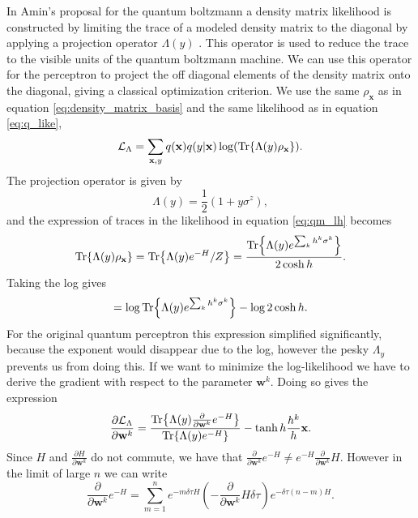 In Amin's proposal for the quantum boltzmann a density matrix likelihood is constructed by limiting the trace of a modeled density matrix to the diagonal by applying a projection operator $\Lambda(y)$  \cite{Amin2018}. This operator is used to reduce the trace to the visible units of the quantum boltzmann machine. We can use this operator for the perceptron to project the off diagonal elements of the density matrix onto the diagonal, giving a classical optimization criterion. We use the same $\rho_\mathbf{x}$ as in equation \ref{eq:density_matrix_basis} and the same likelihood as in equation \ref{eq:q_like},
\begin{equation}
    \mathcal{L}_{\Lambda} = \sum_{\mathbf{x},y} q(\mathbf{x})q(y | \mathbf{x}) \log(\Tr{\Lambda(y)\rho_\mathbf{x}})
    \label{eq:qm_lh}.
\end{equation}
The projection operator is given by
\begin{equation*}
    \Lambda(y) = \frac{1}{2} (1 + y\sigma^z),
\end{equation*}
and the expression of traces in the likelihood in equation \ref{eq:qm_lh} becomes
\begin{equation*}
    \Tr{\Lambda(y) \rho_\mathbf{x}} = \Tr{\Lambda(y) e^{-H} / Z} = \frac{\Tr{\Lambda(y) e^{\sum_k h^k \sigma^k}}}{2 \cosh h}.
\end{equation*}
Taking the log gives
\begin{equation}
  = \log\Tr{\Lambda(y) e^{\sum_k h^k \sigma^k}} - \log2 \cosh h
  \label{eq:lh_tr}.
\end{equation}
For the original quantum perceptron this expression simplified significantly, because the exponent would disappear due to the log, however the pesky $\Lambda_y$ prevents us from doing this. If we want to minimize the log-likelihood we have to derive the gradient with respect to the parameter $\mathbf{w}^k$. Doing so gives the expression
\begin{equation*}
    \frac{\partial \mathcal{L}_{\Lambda}}{\partial \mathbf{w}^k} = \frac{\Tr{\Lambda(y) \frac{\partial }{\partial \mathbf{w}^k} e^{-H}}}{\Tr{\Lambda(y) e^{-H}}} - \tanh{h}\frac{h^k}{h} \mathbf{x}.
\end{equation*}
Since $H$ and $\frac{\partial H}{\partial \mathbf{w}^k} $ do not commute, we have that $\frac{\partial }{\partial \mathbf{w}^k} e^{-H} \neq e^{-H} \frac{\partial }{\partial \mathbf{w}^k} H$. However in the limit of large $n$ we can write
\begin{equation*}
    \frac{\partial }{\partial \mathbf{w}^k} e^{-H} = \sum_{m=1}^n e^{-m \delta\tau  H} (- \frac{\partial }{\partial \mathbf{w}^k} H \delta\tau)e^{-\delta\tau(n-m) H}.
\end{equation*}
